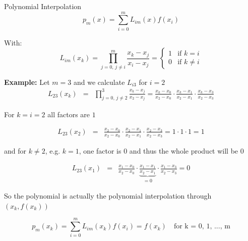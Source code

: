 \documentclass[11pt,compress,t,notes=noshow, xcolor=table]{beamer}
\begin{document}
\begin{vbframe}{Polynomial Interpolation}
$$
p_m(x) = \sum_{i = 0}^m L_{im}(x)f(x_{i})
$$

\framebreak


\begin{footnotesize}
With:
\vspace*{-0.6cm}
$$
L_{im}(x_k) = \prod_{j = 0,\, j \not= i}^m \frac{x_k - x_{j}}{x_{i} - x_{j}} = \begin{cases}
 1 & \text{if } k = i \\
 0 & \text{if } k \neq i
\end{cases}
$$
\end{footnotesize}

\begin{footnotesize}
\textbf{Example:} Let $m = 3$ and we calculate $L_{i3}$ for $i = 2$
\begin{eqnarray*}
L_{23}(x_k) &=& \prod_{j = 0,\, j \not= 2}^3 \frac{x_k - x_{j}}{x_2 - x_{j}} = \frac{x_k - x_0}{x_2 - x_0} \cdot \frac{x_k - x_1}{x_2 - x_1} \cdot \frac{x_k - x_3}{x_2 - x_3}
\end{eqnarray*}

For $k = i = 2$ all factors are $1$

\vspace*{-0.3cm}
\begin{eqnarray*}
L_{23}(x_2) &=& \frac{x_2 - x_0}{x_2 - x_0} \cdot \frac{x_2 - x_1}{x_2 - x_1} \cdot \frac{x_2 - x_3}{x_2 - x_3} = 1 \cdot 1 \cdot 1 = 1
\end{eqnarray*}

and for $k \ne 2$, e.g. $k = 1$, one factor is $0$ and thus the whole product will be $0$

\begin{eqnarray*}
L_{23}(x_1) &=& \frac{x_1 - x_0}{x_2 - x_0} \cdot \underbrace{\frac{x_1 - x_1}{x_2 - x_1}}_{= 0} \cdot \frac{x_1 - x_3}{x_2 - x_3} = 0
\end{eqnarray*}

\end{footnotesize}


\begin{footnotesize}
So the polynomial is actually the polynomial interpolation through $(x_k, f(x_k))$

\vspace*{-0.3cm}

$$
p_{m}(x_k) = \sum_{i = 0}^m L_{im}(x_k)%
f(x_i) = f(x_k) \quad \text{for k = 0, 1, ..., m}
$$
\end{footnotesize}




%
%


\end{vbframe}
\end{document}
